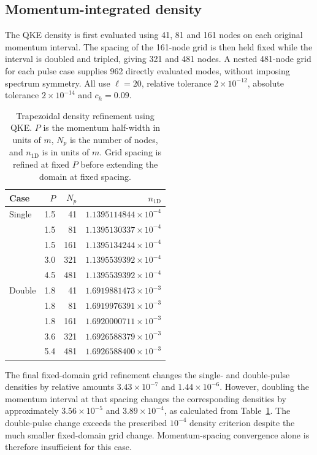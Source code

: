 \documentclass[anonymous]{iopjournal}
\begin{document}
\subsection{Momentum-integrated density}
\label{sec:densityvalidation}

The QKE density is first evaluated using 41, 81 and 161 nodes on each original momentum interval. The spacing of the 161-node grid is then held fixed while the interval is doubled and tripled, giving 321 and 481 nodes. A nested 481-node grid for each pulse case supplies 962 directly evaluated modes, without imposing spectrum symmetry. All use $\ell=20$, relative tolerance $2\times10^{-12}$, absolute tolerance $2\times10^{-14}$ and $c_h=0.09$.

\begin{table}[htbp]
\centering\small
\caption{Trapezoidal density refinement using QKE. $P$ is the momentum half-width in units of $m$, $N_p$ is the number of nodes, and $n_{1\mathrm D}$ is in units of $m$. Grid spacing is refined at fixed $P$ before extending the domain at fixed spacing.}
\label{tab:density}
\begin{tabular}{lrrr}\toprule
Case & $P$ & $N_p$ & $n_{1\mathrm D}$\\\midrule
Single & 1.5 & 41 & $1.1395114844\times10^{-4}$\\
 & 1.5 & 81 & $1.1395130337\times10^{-4}$\\
 & 1.5 & 161 & $1.1395134244\times10^{-4}$\\
 & 3.0 & 321 & $1.1395539392\times10^{-4}$\\
 & 4.5 & 481 & $1.1395539392\times10^{-4}$\\
Double & 1.8 & 41 & $1.6919881473\times10^{-3}$\\
 & 1.8 & 81 & $1.6919976391\times10^{-3}$\\
 & 1.8 & 161 & $1.6920000711\times10^{-3}$\\
 & 3.6 & 321 & $1.6926588379\times10^{-3}$\\
 & 5.4 & 481 & $1.6926588400\times10^{-3}$\\
\bottomrule\end{tabular}
\end{table}

The final fixed-domain grid refinement changes the single- and double-pulse densities by relative amounts $3.43\times10^{-7}$ and $1.44\times10^{-6}$. However, doubling the momentum interval at that spacing changes the corresponding densities by approximately $3.56\times10^{-5}$ and $3.89\times10^{-4}$, as calculated from Table~\ref{tab:density}. The double-pulse change exceeds the prescribed $10^{-4}$ density criterion despite the much smaller fixed-domain grid change. Momentum-spacing convergence alone is therefore insufficient for this case.
\end{document}
